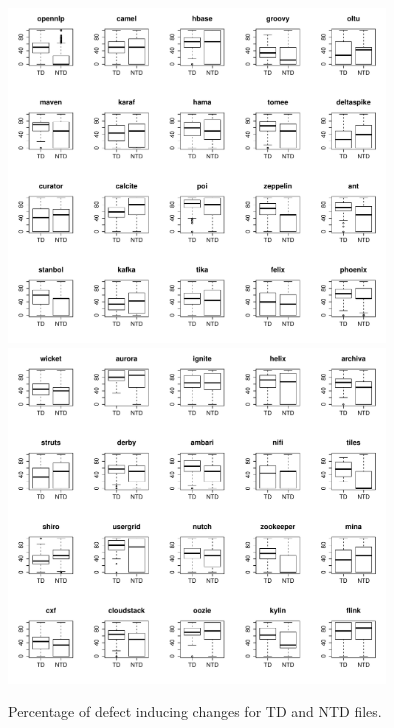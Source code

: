 \begin{figure}[tb]
	\centering
	\includegraphics[width=100mm]{figures/chapter4/rq2_boxplots_1}
	\includegraphics[width=100mm]{figures/chapter4/rq2_boxplots_2}
	\caption{Percentage of defect inducing changes for TD and NTD files.}
	\label{figure:percentage_of_bug_inducing_td_vs_ntd}
\end{figure}



